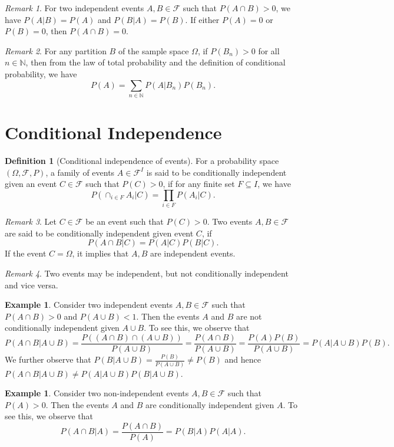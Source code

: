 \documentclass[letterpaper,10pt,english]{article}
\theoremstyle{plain}
\theoremstyle{definition}
\newtheorem{defn}[thm]{Definition}
\newtheorem{exmp}[thm]{Example}
\theoremstyle{remark}
\newtheorem{rem}{Remark}
\newcommand{\EQ}[1]{\begin{equation*}#1\end{equation*}}
\newcommand{\N}{\mathbb{N}}
\newcommand{\sF}{\mathscr{F}}
\begin{document}
\begin{rem}
For two independent events $A, B \in \sF$ such that $P(A\cap B) > 0$, 
we have  $P(A|B) = P(A)$ and  $P(B|A) = P(B)$. 
If either $P(A) = 0$ or $P(B) = 0$, then $P(A \cap B) = 0$. 
\end{rem}
\begin{rem}
For any partition $B$ of the sample space $\Omega$, if $P(B_n) > 0$ for all $n \in \N$, then from the law of total probability and the definition of conditional probability, we have 
\EQ{
P(A) = \sum_{n \in \N}P(A|B_n)P(B_n).
}
\end{rem}


\section{Conditional Independence}
\begin{defn}[Conditional independence of events] 
For a probability space $(\Omega, \sF, P)$, a family of events $A \in \sF^I$ is said to be conditionally independent given an event $C \in \sF$ such that $P(C) > 0$, 
if for any finite set $F \subseteq I$, we have 
\EQ{
P(\cap_{i \in F}A_i|C) = \prod_{i \in F}P(A_i|C). 
}
\end{defn}
\begin{rem} 
Let $C \in \sF$ be an event such that $P(C) > 0$. 
Two events $A, B \in \sF$ are said to be conditionally independent given event $C$, if 
\EQ{
P(A \cap B|C) = P(A|C) P(B|C). 
}
If the event $C = \Omega$, it implies that $A, B$ are independent events. 
\end{rem}
\begin{rem}
Two events may be independent, but not conditionally independent and vice versa. 
\end{rem}
\begin{shaded}
\begin{exmp} 
Consider two independent events $A, B \in \sF$ such that $P(A\cap B) > 0$ and $P(A \cup B) < 1$. 
Then the events $A$ and $B$ are not conditionally independent given $A\cup B$.  
To see this, we observe that 
\EQ{
P(A \cap B | A\cup B) = \frac{P( (A \cap B)\cap (A \cup B))}{P(A\cup B)} = \frac{P(A \cap B)}{P(A\cup B)} 
= \frac{P(A)P(B)}{P(A \cup B)} =  {P(A|A \cup B)}{P(B)}. 
}
We further observe that $P(B|A\cup B) = \frac{P(B)}{P(A\cup B)} \neq P(B)$ and hence $P(A \cap B | A\cup B) \neq P(A|A\cup B)P(B|A\cup B)$. 
\end{exmp}
\begin{exmp} 
Consider two non-independent events $A, B \in \sF$ such that $P(A) > 0$. 
Then the events $A$ and $B$ are conditionally independent given $A$. 
To see this, we observe that 
\EQ{
P(A \cap B | A) = \frac{P(A \cap B)}{P(A)} = P(B|A)P(A|A). 
}
\end{exmp}
\end{shaded}
\end{document}
